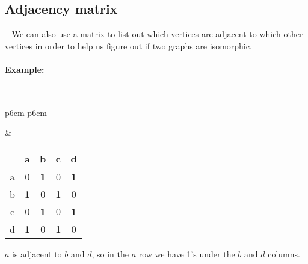 \documentclass[a4paper,12pt]{book}
\begin{document}
\newpage

    \subsection{Adjacency matrix}

    \begin{intro}{\ }
        We can also use a matrix to list out which vertices are adjacent
        to which other vertices in order to help us figure out if two
        graphs are isomorphic.

        \paragraph{Example:} ~\\

        \begin{tabular}{p{6cm} p{6cm}}
        
            \begin{tikzpicture}
                \filldraw (0,0) circle (1pt) node[left] {a};
                \filldraw (1,0) circle (1pt) node[right] {b};
                \filldraw (1,1) circle (1pt) node[right] {c};
                \filldraw (0,1) circle (1pt) node[left] {d};

                \draw (0,0) -- (1,0) -- (1,1) -- (0,1) -- (0,0);
            \end{tikzpicture}

            &

            \begin{tabular}{c | c c c c}
                & a & b & c & d
                \\ \hline
                a & 0 & \textbf{1} & 0 & \textbf{1}
                \\
                b & \textbf{1} & 0 & \textbf{1} & 0
                \\
                c & 0 & \textbf{1} & 0 & \textbf{1}
                \\
                d & \textbf{1} & 0 & \textbf{1} & 0
            \end{tabular}
            
        \end{tabular}

        $a$ is adjacent to $b$ and $d$, so in the $a$ row we have 1's under the $b$ and $d$ columns.
    \end{intro}
\end{document}
